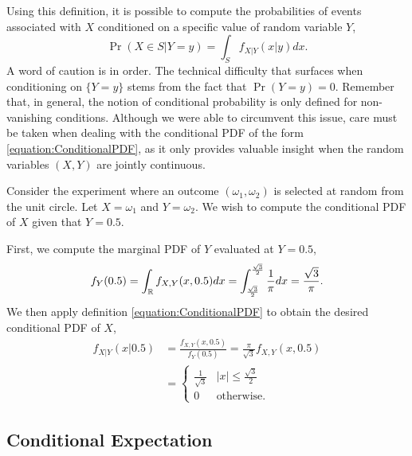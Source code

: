 Using this definition, it is possible to compute the probabilities of events associated with $X$ conditioned on a specific value of random variable $Y$,
\begin{equation*}
\Pr (X \in S | Y = y) = \int_S f_{X|Y} (x|y) dx .
\end{equation*}
A word of caution is in order.
The technical difficulty that surfaces when conditioning on $\{ Y = y \}$ stems from the fact that $\Pr (Y = y) = 0$.
Remember that, in general, the notion of conditional probability is only defined for non-vanishing conditions.
Although we were able to circumvent this issue, care must be taken when dealing with the conditional PDF of the form \eqref{equation:ConditionalPDF}, as it only provides valuable insight when the random variables $(X, Y)$ are jointly continuous.

\begin{example}
Consider the experiment where an outcome $(\omega_1, \omega_2)$ is selected at random from the unit circle.
Let $X = \omega_1$ and $Y = \omega_2$.
We wish to compute the conditional PDF of $X$ given that $Y = 0.5$.

First, we compute the marginal PDF of $Y$ evaluated at $Y = 0.5$,
\begin{equation*}
f_Y (0.5) = \int_{\mathbb{R}} f_{X,Y} (x, 0.5) dx
= \int_{\frac{\sqrt{3}}{2}}^{\frac{\sqrt{3}}{2}} \frac{1}{\pi} dx
= \frac{\sqrt{3}}{\pi} .
\end{equation*}
We then apply definition \eqref{equation:ConditionalPDF} to obtain the desired conditional PDF of $X$,
\begin{equation*}
\begin{split}
f_{X|Y} ( x | 0.5 ) &= \frac{f_{X,Y} (x, 0.5)}{f_{Y} ( 0.5 ) }
= \frac{\pi}{\sqrt{3}} f_{X,Y} (x, 0.5) \\
&= \begin{cases} \frac{1}{\sqrt{3}} & |x| \leq \frac{\sqrt{3}}{2} \\
0 & \text{otherwise} . \end{cases}
\end{split}
\end{equation*}
\end{example}


\subsection{Conditional Expectation}

